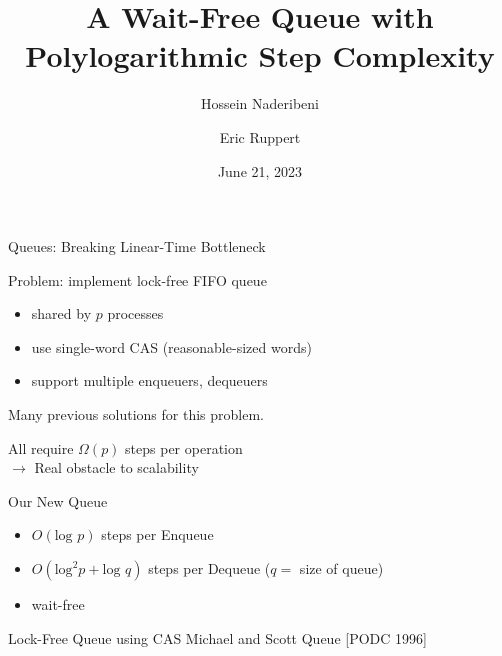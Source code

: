 \documentclass[compress]{beamer}
\title{A Wait-Free Queue with Polylogarithmic Step Complexity}
\author{Hossein Naderibeni \and Eric Ruppert}
\date{June 21, 2023}
\newcommand{\op}[1]{\mbox{\sc #1}}
\renewcommand{\log}{\mbox{log }} %
\begin{document}
\begin{frame}
\maketitle
\end{frame}


\begin{frame}{Queues:  Breaking Linear-Time Bottleneck}

Problem:  implement lock-free FIFO queue
\begin{itemize}
\item shared by $p$ processes
\item use single-word CAS (reasonable-sized words)
\item support multiple enqueuers, dequeuers
\end{itemize}

\medskip
\pause

Many previous solutions for this problem.

\medskip

All require $\Omega(p)$ steps per operation\\
$\rightarrow$ Real obstacle to scalability

\pause
\begin{block}{Our New Queue}
\begin{itemize}
\item $O(\log p)$ steps per \op{Enqueue}
\item $O(\mbox{log}^2 p + \log q)$ steps per \op{Dequeue} ($q=$ size of queue)
\item wait-free
\end{itemize}
\end{block}


\end{frame}


\begin{frame}{Lock-Free Queue using CAS}
Michael and Scott Queue [PODC 1996]

\bigskip


\only<2>{}%
\only<3>{}%
\end{frame}
\end{document}
